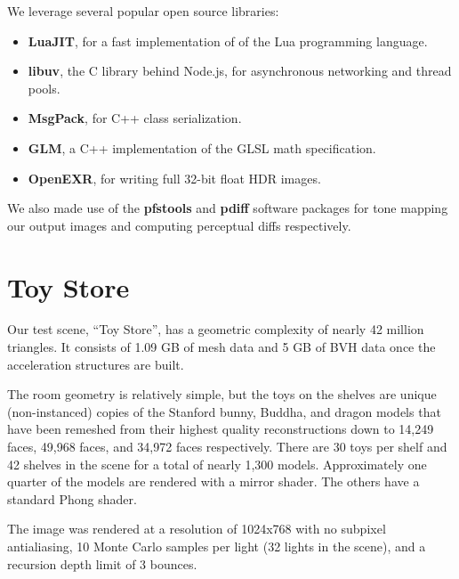 \documentclass[12pt]{ucthesis}
\begin{document}
We leverage several popular open source libraries:

\begin{itemize}
    \item \textbf{LuaJIT}, for a fast implementation of of the Lua programming language.
    \item \textbf{libuv}, the C library behind Node.js, for asynchronous networking and thread pools.
    \item \textbf{MsgPack}, for C++ class serialization.
    \item \textbf{GLM}, a C++ implementation of the GLSL math specification.
    \item \textbf{OpenEXR}, for writing full 32-bit float HDR images.
\end{itemize}

We also made use of the \textbf{pfstools} and \textbf{pdiff} software packages
for tone mapping our output images and computing perceptual diffs respectively.

\section{Toy Store}
\label{toystore}

Our test scene, ``Toy Store'', has a geometric complexity of nearly 42 million
triangles. It consists of 1.09 GB of mesh data and 5 GB of BVH data once the
acceleration structures are built.

The room geometry is relatively simple, but the toys on the shelves are unique
(non-instanced) copies of the Stanford bunny, Buddha, and dragon models that
have been remeshed from their highest quality reconstructions down to 14,249
faces, 49,968 faces, and 34,972 faces respectively. There are 30 toys per
shelf and 42 shelves in the scene for a total of nearly 1,300 models. Approximately
one quarter of the models are rendered with a mirror shader. The others have
a standard Phong shader.

The image was rendered at a resolution of 1024x768 with no subpixel antialiasing,
10 Monte Carlo samples per light (32 lights in the scene), and a recursion
depth limit of 3 bounces.
\end{document}
